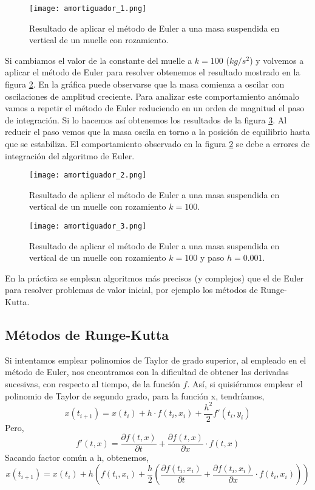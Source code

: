 \begin{figure}[h]
	\centering
	\texttt{[image: amortiguador\_1.png]}
	\caption{Resultado de aplicar el método de Euler a una masa suspendida en vertical de un muelle con rozamiento.}
	\label{fig:amortiguador1}
\end{figure}

Si cambiamos el valor de la constante del muelle a $k=100$ ($kg/s^2$) y volvemos a aplicar el método de Euler para resolver obtenemos el resultado mostrado en la figura \ref{fig:amortiguador2}. En la gráfica puede observarse que la masa comienza a oscilar con oscilaciones de amplitud creciente. Para analizar este comportamiento anómalo vamos a repetir el método de Euler reduciendo en un orden de magnitud el paso de integración. Si lo hacemos así obtenemos los resultados de la figura \ref{fig:amortiguador3}. Al reducir el paso vemos que la masa oscila en torno a la posición de equilibrio hasta que se estabiliza. El comportamiento observado en la figura \ref{fig:amortiguador2} se debe a errores de integración del algoritmo de Euler.

\begin{figure}[h]
	\centering
	\texttt{[image: amortiguador\_2.png]}
	\caption{Resultado de aplicar el método de Euler a una masa suspendida en vertical de un muelle con rozamiento $k=100$.}
	\label{fig:amortiguador2}
\end{figure}

\begin{figure}[h]
	\centering
	\texttt{[image: amortiguador\_3.png]}
	\caption{Resultado de aplicar el método de Euler a una masa suspendida en vertical de un muelle con rozamiento $k=100$ y paso $h=0.001$.}
	\label{fig:amortiguador3}
\end{figure}

En la práctica se emplean algoritmos más precisos (y complejos) que el de Euler para resolver problemas de valor inicial, por ejemplo los métodos de Runge-Kutta.

\subsection{Métodos de Runge-Kutta} 
Si intentamos emplear polinomios de Taylor de grado superior, al empleado en el método de Euler, nos encontramos con la dificultad de obtener las derivadas sucesivas, con respecto al tiempo, de la función $f$. Así, si quisiéramos emplear el polinomio de Taylor de segundo grado, para la función x, tendríamos,
\begin{equation*}
x(t_{i+1})=x(t_i)+h\cdot f(t_i,x_i)+\frac{h^2}{2}f'(t_i,y_i)
\end{equation*}
Pero,
\begin{equation*}
f'(t,x)=\frac{\partial f(t,x)}{\partial t}+\frac{\partial f(t,x)}{\partial x}\cdot f(t,x)
\end{equation*}
Sacando factor común a h, obtenemos,
\begin{equation*}
x(t_{i+1})=x(t_i)+h\left(f(t_i,x_i)+\frac{h}{2}\left(\frac{\partial f(t_i,x_i)}{\partial t}+\frac{\partial f(t_i,x_i)}{\partial x}\cdot f(t_i,x_i)\right)\right)
\end{equation*}

